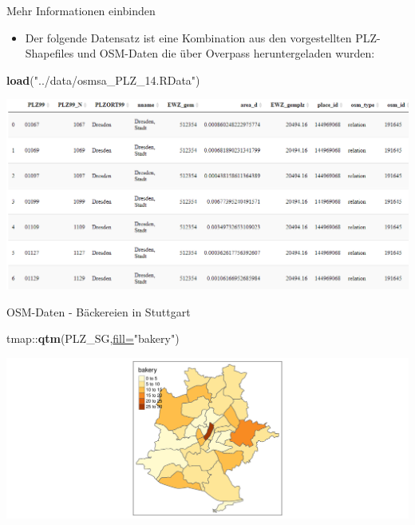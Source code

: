 \documentclass[ignorenonframetext,]{beamer}
\newenvironment{Shaded}{\begin{snugshade}}{\end{snugshade}}
\newcommand{\DataTypeTok}[1]{\textcolor[rgb]{0.74,0.68,0.62}{\underline{#1}}}
\newcommand{\KeywordTok}[1]{\textcolor[rgb]{0.26,0.66,0.93}{\textbf{#1}}}
\newcommand{\NormalTok}[1]{\textcolor[rgb]{0.74,0.68,0.62}{#1}}
\newcommand{\OperatorTok}[1]{\textcolor[rgb]{0.74,0.68,0.62}{#1}}
\newcommand{\StringTok}[1]{\textcolor[rgb]{0.02,0.61,0.04}{#1}}
\providecommand{\tightlist}{%
  \setlength{\itemsep}{0pt}\setlength{\parskip}{0pt}}
\begin{document}
\begin{frame}[fragile]{Mehr Informationen einbinden}
\protect\hypertarget{mehr-informationen-einbinden}{}

\begin{itemize}
\tightlist
\item
  Der folgende Datensatz ist eine Kombination aus den vorgestellten
  PLZ-Shapefiles und OSM-Daten die über Overpass heruntergeladen wurden:
\end{itemize}

\begin{Shaded}
\begin{Highlighting}[]
\KeywordTok{load}\NormalTok{(}\StringTok{"../data/osmsa_PLZ_14.RData"}\NormalTok{)}
\end{Highlighting}
\end{Shaded}

\includegraphics{figure/osmsa_ex.PNG}

\end{frame}

\begin{frame}[fragile]{OSM-Daten - Bäckereien in Stuttgart}
\protect\hypertarget{osm-daten---backereien-in-stuttgart}{}

\begin{Shaded}
\begin{Highlighting}[]
\NormalTok{tmap}\OperatorTok{::}\KeywordTok{qtm}\NormalTok{(PLZ_SG,}\DataTypeTok{fill=}\StringTok{"bakery"}\NormalTok{)}
\end{Highlighting}
\end{Shaded}

\includegraphics{B4_Overpass_files/figure-beamer/unnamed-chunk-23-1.pdf}

\end{frame}
\end{document}
